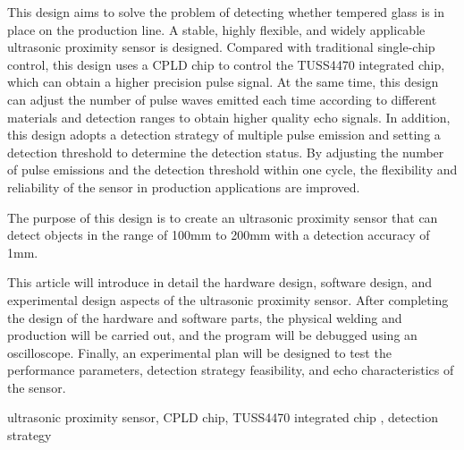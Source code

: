 \begin{EnAbstract}
    
    This design aims to solve the problem of detecting whether tempered glass is in place on the production line. A stable, highly flexible, and widely applicable ultrasonic proximity sensor is designed. Compared with traditional single-chip control, this design uses a CPLD chip to control the TUSS4470 integrated chip, which can obtain a higher precision pulse signal. At the same time, this design can adjust the number of pulse waves emitted each time according to different materials and detection ranges to obtain higher quality echo signals. In addition, this design adopts a detection strategy of multiple pulse emission and setting a detection threshold to determine the detection status. By adjusting the number of pulse emissions and the detection threshold within one cycle, the flexibility and reliability of the sensor in production applications are improved.
    
    The purpose of this design is to create an ultrasonic proximity sensor that can detect objects in the range of 100mm to 200mm with a detection accuracy of 1mm. 
    
    This article will introduce in detail the hardware design, software design, and experimental design aspects of the ultrasonic proximity sensor. After completing the design of the hardware and software parts, the physical welding and production will be carried out, and the program will be debugged using an oscilloscope. Finally, an experimental plan will be designed to test the performance parameters, detection strategy feasibility, and echo characteristics of the sensor.
  
  
    \EnglishKeyWord ultrasonic proximity sensor, CPLD chip, TUSS4470 integrated chip , detection strategy
\end{EnAbstract}